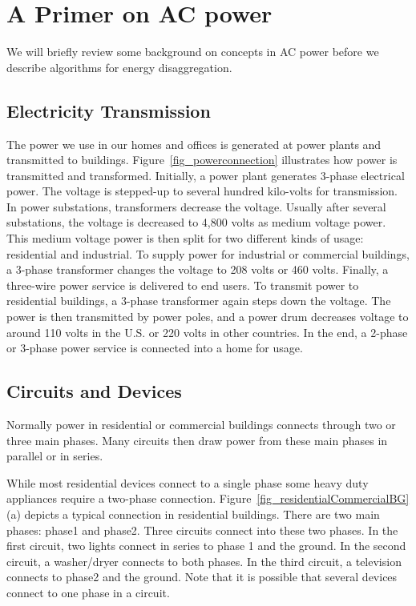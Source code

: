 \section{A Primer on AC power}
\label{sec:basic}
We will briefly review some background on concepts in AC power
before we describe algorithms for energy disaggregation.

\subsection{Electricity Transmission}
The power we use in our homes and offices is
generated at power plants and transmitted to buildings.
Figure~\ref{fig_powerconnection} illustrates how power
is transmitted and transformed.
Initially, a power plant generates 3-phase electrical power.
The voltage is stepped-up to several hundred kilo-volts for 
transmission.
In power substations, transformers decrease the
voltage. Usually after several substations,
the voltage is decreased to 4,800 volts as medium voltage power.
This medium voltage power is then split for two
different kinds of usage: residential and industrial.
To supply power for industrial or commercial buildings,
a 3-phase transformer changes the voltage to 208 volts or 460 volts.
Finally, a three-wire power service is delivered to end users.
To transmit power to residential buildings,
a 3-phase transformer again steps down the voltage.
The power is then transmitted by power poles, and
a power drum decreases voltage to around 110 volts
in the U.S. or 220 volts in other countries.
In the end, a 2-phase or 3-phase power service
is connected into a home for usage.


\subsection{Circuits and Devices}
Normally power in residential or commercial buildings
connects through two or three main phases.
Many circuits then draw power from these main phases
in parallel or in series.

While most residential devices connect to a single phase some
heavy duty appliances require a two-phase connection.
Figure~\ref{fig_residentialCommercialBG} (a) depicts a typical connection
in residential buildings. 
There are two main phases: phase1 and phase2.
Three circuits connect into these two phases.
In the first circuit, two lights connect in series to phase 1 and the ground.
In the second circuit, a washer/dryer connects to both phases.
In the third circuit, a television connects to phase2 and the ground.
Note that it is possible that several devices
connect to one phase in a circuit.


